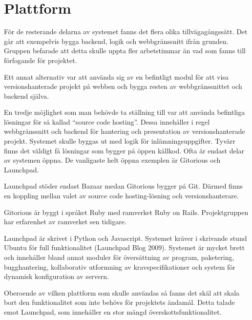 \section{Plattform}
För de resterande delarna av systemet fanns det flera olika tillvägagångssätt. Det går att exempelvis bygga backend, logik och webbgränssnitt ifrån grunden. Gruppen befarade att detta skulle uppta fler arbetstimmar än vad som fanns till förfogande för projektet.

Ett annat alternativ var att använda sig av en befintligt modul för att visa versionshanterade projekt på webben och bygga resten av webbgränssnittet och backend själva.

En tredje möjlighet som man behövde ta ställning till var att använda befintliga lösningar för så kallad “source code hosting”. Dessa innehåller i regel webbgränssnitt och backend för hantering och presentation av versionshanterade projekt. Systemet skulle byggas ut med logik för inlämningsuppgifter. Tyvärr finns det väldigt få lösningar som bygger på öppen källkod. Ofta är endast delar av systemen öppna. De vanligaste helt öppna exemplen är Gitorious och Launchpad.

Launchpad stöder endast Bazaar medan Gitorious bygger på Git. Därmed finns en koppling mellan valet av source code hosting-lösning och versionshanterare.

Gitorious är byggt i språket Ruby med ramverket Ruby on Rails. Projektgruppen har erfarenhet av ramverket sen tidigare. 

Launchpad är skrivet i Python och Javascript. Systemet kräver i skrivande stund Ubuntu för full funktionalitet (Launchpad Blog 2009). Systemet är mycket brett och innehåller bland annat moduler för översättning av program, paketering, bugghantering, kollaborativ utformning av kravspecifikationer och system för dynamisk konfiguration av servern.

Oberoende av vilken plattform som skulle användas så fanns det skäl att skala bort den funktionalitet som inte behövs för projektets ändamål. Detta talade emot Launchpad, som innehåller en stor mängd överskottsfunktionalitet.